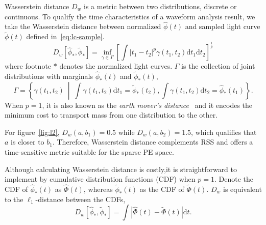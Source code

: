 Wasserstein distance $D_w$ is a metric between two distributions, discrete or continuous. To qualify the time characteristics of a waveform analysis result, we take the Wasserstein distance between normalized $\hat{\phi}(t)$ and sampled light curve $\tilde{\phi}(t)$ defined in~\eqref{eq:lc-sample}.
\begin{equation}
  D_w\left[\hat{\phi}_*, \tilde{\phi}_*\right] = \inf_{\gamma \in \Gamma} \left[\int \left\vert t_1 - t_2 \right\vert^p \gamma(t_1, t_2)\mathrm{d}t_1\mathrm{d}t_2\right]^{\frac{1}{p}}
\end{equation}
where footnote $*$ denotes the normalized light curves. $\Gamma$ is the collection of joint distributions with marginals $\hat{\phi}_*(t)$ and $\tilde{\phi}_*(t)$,
\begin{equation*}
  \label{eq:joint}
  \Gamma = \left\{\gamma(t_1, t_2) ~\middle\vert~ \int\gamma(t_1,t_2)\mathrm{d}t_1 = \tilde{\phi}_*(t_2) , \int\gamma(t_1,t_2)\mathrm{d}t_2 = \hat{\phi}_*(t_1) \right\}.
\end{equation*}
When $p=1$, it is also known as the \textit{earth mover's distance}~\cite{levina_earth_2001} and it encodes the minimum cost to transport mass from one distribution to the other.

For figure~\ref{fig:l2}, $D_w(a, b_1) = 0.5$ while $D_w(a, b_2) = 1.5$, which qualifies that $a$ is closer to $b_1$. Therefore, Wasserstein distance complements RSS and offers a time-sensitive metric suitable for the sparse PE space. 

Although calculating Wasserstein distance is costly,it is straightforward to implement by cumulative distribution functions (CDF) when $p=1$. Denote the CDF of $\hat{\phi}_*(t)$ as $\hat\Phi(t)$, whereas $\tilde{\phi}_*(t)$ as the CDF of $\tilde\Phi(t)$. $D_w$ is equivalent to the $\ell_1$-distance between the CDFs,
\begin{equation}
    D_w\left[\hat{\phi}_*, \tilde{\phi}_*\right] = \int\left|\hat{\Phi}(t) - \tilde{\Phi}(t)\right| \mathrm{d}t.
    \label{eq:numerical}
\end{equation}
